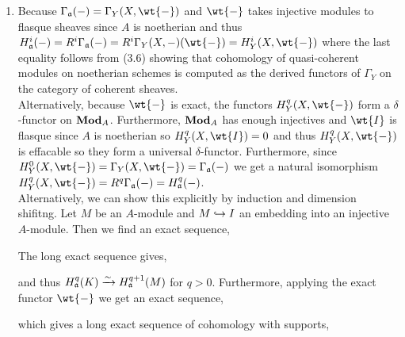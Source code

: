 \documentclass[12pt]{article}
\begin{document}
\begin{enumerate}
\item Because $\Gamma_\a(-) = \Gamma_Y(X, \wt{-})$ and $\wt{-}$ takes injective modules to flasque sheaves since $A$ is noetherian and thus $H_\a^i(-) = R^i \Gamma_\a(-) = R^i \Gamma_Y(X, -)(\wt{-}) = H_Y^i(X, \wt{-})$ where the last equality follows from (3.6) showing that cohomology of quasi-coherent modules on noetherian schemes is computed as the derived functors of $\Gamma_Y$ on the category of coherent sheaves. 
\bigskip\\
Alternatively, because $\wt{-}$ is exact, the functors $H^q_Y(X, \wt{-})$ form a $\delta$-functor on $\mathbf{Mod}_{A}$. Furthermore, $\mathbf{Mod}_{A}$ has enough injectives and $\wt{I}$ is flasque since $A$ is noetherian so $H^q_Y(X, \wt{I}) = 0$ and thus $H^q_Y(X, \wt{-})$ is effacable so they form a universal $\delta$-functor. Furthermore, since $H^0_Y(X, \wt{-}) = \Gamma_Y(X, \wt{-}) = \Gamma_\a(-)$ we get a natural isomorphism $H^q_Y(X, \wt{-}) = R^q \Gamma_\a(-) = H^q_\a(-)$.
\bigskip\\
Alternatively, we can show this explicitly by induction and dimension shifitng. Let $M$ be an $A$-module and $M \hookrightarrow I$ an embedding into an injective $A$-module. Then we find an exact sequence,
\begin{center}
\end{center}
The long exact sequence gives,
\begin{center}
\end{center}
and thus $H^q_{\mathfrak{a}}(K) \xrightarrow{\sim} H^{q+1}_{\mathfrak{a}}(M)$ for $q > 0$. Furthermore, applying the exact functor $\wt{-}$ we get an exact sequence,
\begin{center}
\end{center}
which gives a long exact sequence of cohomology with supports,
\begin{center}
\end{center}
\end{enumerate}
\end{document}
